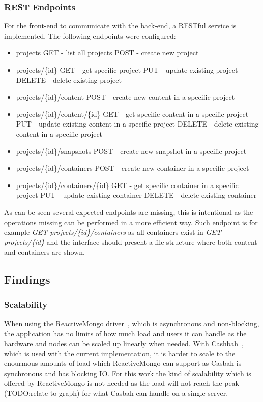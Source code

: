 \documentclass[a4paper,12pt]{article}
\newcommand{\fix}{\colorbox{yellow!30}{TODO:}}
\begin{document}
\subsubsection{REST Endpoints}
For the front-end to communicate with the back-end, a RESTful service is implemented.
The following endpoints were configured:

\begin{itemize}
  \item projects
      \subitem GET - list all projects
      \subitem POST - create new project
  \item projects/\{id\}
      \subitem GET - get specific project
      \subitem PUT - update existing project
      \subitem DELETE - delete existing project
  \item projects/\{id\}/content
      \subitem POST - create new content in a specific project 
  \item projects/\{id\}/content/\{id\}
      \subitem GET - get specific content in a specific project
      \subitem PUT - update existing content in a specific project
      \subitem DELETE - delete existing content in a specific project

  \item projects/\{id\}/snapshots
      \subitem POST - create new snapshot in a specific project 

  \item projects/\{id\}/containers
      \subitem POST - create new container in a specific project 
  \item projects/\{id\}/containers/\{id\}
      \subitem GET - get specific container in a specific project
      \subitem PUT - update existing container
      \subitem DELETE - delete existing container
\end{itemize}

As can be seen several expected endpoints are missing, this is intentional as the operations missing
can be performed in a more efficient way. Such endpoint is for example \textit{GET 
projects/\{id\}/containers} as all containers exist in \textit{GET projects/\{id\}} and the interface
should present a file structure where both content and containers are shown.

\subsection{Findings}
\subsubsection{Scalability}
When using the ReactiveMongo driver~\cite{REACTIVEMONGO}, which is asynchronous and non-blocking, 
the application has no limits of how much load and users it can handle as the hardware and nodes 
can be scaled up linearly when needed. With Cashbah~\cite{CASBAH}, which is used with the current 
implementation, it is harder to scale to the enourmous amounts of load which ReactiveMongo can 
support as Casbah is synchronous and has blocking IO. For this work the kind of scalability which 
is offered by ReactiveMongo is not needed as the load will not reach the peak (\fix relate to 
graph) for what Casbah can handle on a single server. 
\end{document}

